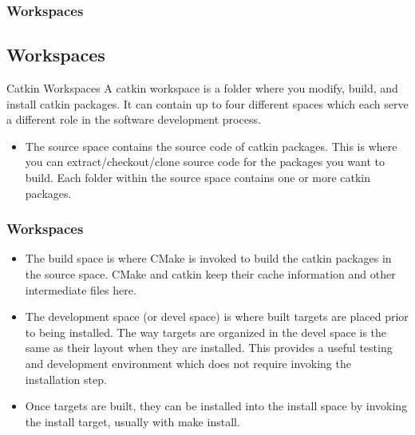 \documentclass{beamer}
\begin{document}

	\begin{frame}
		\frametitle{Workspaces}
		\subsection{Workspaces}
		
		\begin{block}{Catkin Workspaces} 
		    A catkin workspace is a folder where you modify, build, and install catkin packages. It can contain up to four different spaces which each serve a different role in the software development process.\cite{Workspaces:2019}
		\end{block}
		
	    \begin{itemize}
	        \item \medskip The source space contains the source code of catkin packages. This is where you can extract/checkout/clone source code for the packages you want to build. Each folder within the source space contains one or more catkin packages.
	    \end{itemize}

	\end{frame}



	\begin{frame}
	    \frametitle{Workspaces}
	    \begin{itemize}
	        \item The build space is where CMake is invoked to build the catkin packages in the source space. CMake and catkin keep their cache information and other intermediate files here. \medskip
	        \item The development space (or devel space) is where built targets are placed prior to being installed. The way targets are organized in the devel space is the same as their layout when they are installed. This provides a useful testing and development environment which does not require invoking the installation step.\medskip
	        \item Once targets are built, they can be installed into the install space by invoking the install target, usually with make install.\medskip 

	    \end{itemize}
	\end{frame}
\end{document}
